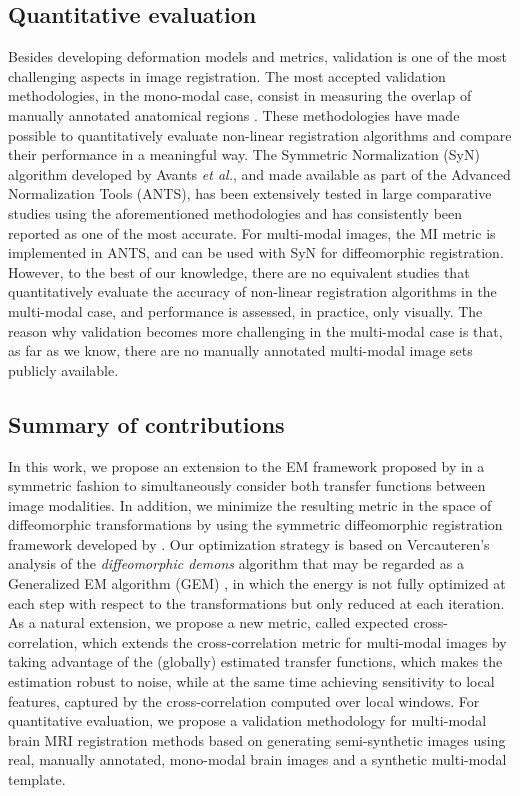 \subsection{Quantitative evaluation}
Besides developing deformation models and metrics, validation is one of the most challenging aspects in image registration. The most accepted validation methodologies, in the mono-modal case, consist in measuring the overlap of manually annotated anatomical regions \citep{Klein2009, Klein2010, Rohlfing2012}. These methodologies have made possible to quantitatively evaluate non-linear registration algorithms and compare their performance in a meaningful way. The Symmetric Normalization (SyN) algorithm developed by Avants {\it et al.}, and made available as part of the Advanced Normalization Tools (ANTS), has been extensively tested in large comparative studies using the aforementioned methodologies and has consistently been reported as one of the most accurate. For multi-modal images, the MI metric is implemented in ANTS, and can be used with SyN for diffeomorphic registration. However, to the best of our knowledge, there are no equivalent studies that quantitatively evaluate the accuracy of non-linear registration algorithms in the multi-modal case, and performance is assessed, in practice, only visually. The reason why validation becomes more challenging in the multi-modal case is that, as far as we know, there are no manually annotated multi-modal image sets publicly available.

\subsection{Summary of contributions}
In this work, we propose an extension to the EM framework proposed by \cite{Arce-santana2014} in a symmetric fashion to simultaneously consider both transfer functions between image modalities. In addition, we minimize the resulting metric in the space of diffeomorphic transformations by using the symmetric diffeomorphic registration framework developed by \cite{Avants2008, Avants2011}. Our optimization strategy is based on Vercauteren's analysis of the \textit{diffeomorphic demons} algorithm \citep{Vercauteren2009} that may be regarded as a Generalized EM algorithm (GEM) \citep{Neal1998}, in which the energy is not fully optimized at each step with respect to the transformations but only reduced at each iteration. As a natural extension, we propose a new metric, called expected cross-correlation, which extends the cross-correlation metric for multi-modal images by taking advantage of the (globally) estimated transfer functions, which makes the estimation robust to noise, while at the same time achieving sensitivity to local features, captured by the cross-correlation computed over local windows. For quantitative evaluation, we propose a validation methodology for multi-modal brain MRI registration methods based on generating semi-synthetic images using real, manually annotated, mono-modal brain images and a synthetic multi-modal template.\\

